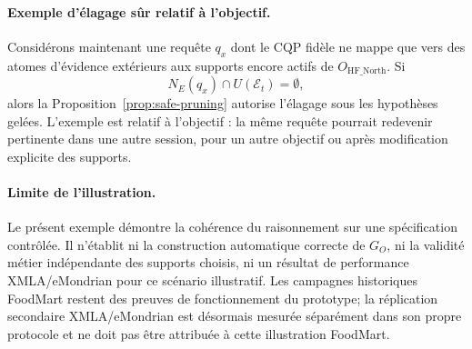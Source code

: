 \paragraph*{Exemple d'élagage sûr relatif à l'objectif.}
Considérons maintenant une requête $q_x$ dont le CQP fidèle ne mappe que vers des atomes d'évidence extérieurs aux supports encore actifs de $O_{\mathrm{HF\_North}}$. Si
\[
N_E(q_x)\cap U(\mathcal{E}_t)=\emptyset,
\]
alors la Proposition~\ref{prop:safe-pruning} autorise l'élagage sous les hypothèses gelées. L'exemple est relatif à l'objectif : la même requête pourrait redevenir pertinente dans une autre session, pour un autre objectif ou après modification explicite des supports.

\paragraph*{Limite de l'illustration.}
Le présent exemple démontre la cohérence du raisonnement sur une spécification contrôlée. Il n'établit ni la construction automatique correcte de $G_O$, ni la validité métier indépendante des supports choisis, ni un résultat de performance XMLA/eMondrian pour ce scénario illustratif. Les campagnes historiques FoodMart restent des preuves de fonctionnement du prototype; la réplication secondaire XMLA/eMondrian est désormais mesurée séparément dans son propre protocole et ne doit pas être attribuée à cette illustration FoodMart.
